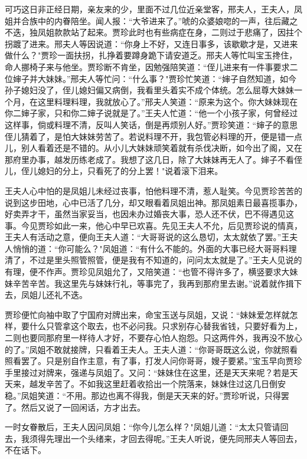 可巧这日非正经日期，亲友来的少，里面不过几位近亲堂客，邢夫人，王夫人，凤姐并合族中的内眷陪坐。闻人报：“大爷进来了。”唬的众婆娘唿的一声，往后藏之不迭，独凤姐款款站了起来。贾珍此时也有些病症在身，二则过于悲痛了，因拄个拐踱了进来。邢夫人等因说道：“你身上不好，又连日事多，该歇歇才是，又进来做什么？"贾珍一面扶拐，扎挣着要蹲身跪下请安道乏。邢夫人等忙叫宝玉搀住，命人挪椅子来与他坐。贾珍断不肯坐，因勉强陪笑道：“侄儿进来有一件事要求二位婶子并大妹妹。”邢夫人等忙问：“什么事？"贾珍忙笑道：“婶子自然知道，如今孙子媳妇没了，侄儿媳妇偏又病倒，我看里头着实不成个体统。怎么屈尊大妹妹一个月，在这里料理料理，我就放心了。”邢夫人笑道：“原来为这个。你大妹妹现在你二婶子家，只和你二婶子说就是了。”王夫人忙道：“他一个小孩子家，何曾经过这样事，倘或料理不清，反叫人笑话，倒是再烦别人好。”贾珍笑道：“婶子的意思侄儿猜着了，是怕大妹妹劳苦了。若说料理不开，我包管必料理的开，便是错一点儿，别人看着还是不错的。从小儿大妹妹顽笑着就有杀伐决断，如今出了阁，又在那府里办事，越发历练老成了。我想了这几日，除了大妹妹再无人了。婶子不看侄儿，侄儿媳妇的分上，只看死了的分上罢！"说着滚下泪来。

王夫人心中怕的是凤姐儿未经过丧事，怕他料理不清，惹人耻笑。今见贾珍苦苦的说到这步田地，心中已活了几分，却又眼看着凤姐出神。那凤姐素日最喜揽事办，好卖弄才干，虽然当家妥当，也因未办过婚丧大事，恐人还不伏，巴不得遇见这事。今见贾珍如此一来，他心中早已欢喜。先见王夫人不允，后见贾珍说的情真，王夫人有活动之意，便向王夫人道：“大哥哥说的这么恳切，太太就依了罢。”王夫人悄悄的道：“你可能么？"凤姐道：“有什么不能的。外面的大事已经大哥哥料理清了，不过是里头照管照管，便是我有不知道的，问问太太就是了。”王夫人见说的有理，便不作声。贾珍见凤姐允了，又陪笑道：“也管不得许多了，横竖要求大妹妹辛苦辛苦。我这里先与妹妹行礼，等事完了，我再到那府里去谢。”说着就作揖下去，凤姐儿还礼不迭。

贾珍便忙向袖中取了宁国府对牌出来，命宝玉送与凤姐，又说：“妹妹爱怎样就怎样，要什么只管拿这个取去，也不必问我。只求别存心替我省钱，只要好看为上，二则也要同那府里一样待人才好，不要存心怕人抱怨。只这两件外，我再没不放心的了。”凤姐不敢就接牌，只看着王夫人。王夫人道：“你哥哥既这么说，你就照看照看罢了。只是别自作主意，有了事，打发人问你哥哥，嫂子要紧。”宝玉早向贾珍手里接过对牌来，强递与凤姐了。又问：“妹妹住在这里，还是天天来呢？若是天天来，越发辛苦了。不如我这里赶着收拾出一个院落来，妹妹住过这几日倒安稳。”凤姐笑道：“不用。那边也离不得我，倒是天天来的好。”贾珍听说，只得罢了。然后又说了一回闲话，方才出去。

一时女眷散后，王夫人因问凤姐：“你今儿怎么样？"凤姐儿道：“太太只管请回去，我须得先理出一个头绪来，才回去得呢。”王夫人听说，便先同邢夫人等回去，不在话下。

